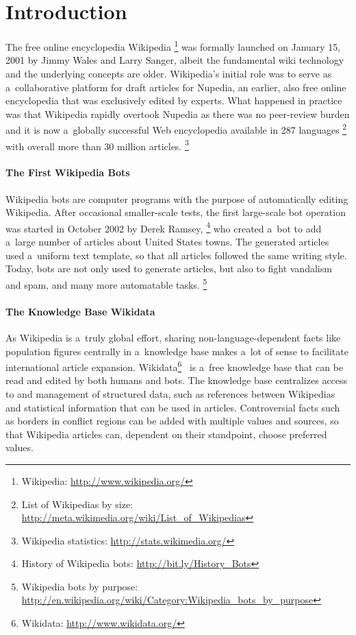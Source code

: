 \documentclass{sig-alternate-2013}
\newcommand{\inlinelistingsize}{\fontsize{8pt}{11pt}}
\let\oldurl\url
\renewcommand{\url}[1]{\inlinelistingsize\oldurl{#1}}
\begin{document}
\section{Introduction}

The free online encyclopedia Wikipedia%
\footnote{Wikipedia: \url{http://www.wikipedia.org/}}
was formally lau\-nched on January 15, 2001
by Jimmy Wales and Larry Sanger,
albeit the fundamental wiki technology and the underlying concepts are older.
Wikipedia's initial role was to serve
as a~collaborative platform for draft articles for Nupedia,
an earlier, also free online encyclopedia that was exclusively edited by experts.
What happened in practice was that Wikipedia rapidly overtook Nupedia
as there was no peer-review burden
and it is now a~globally successful Web encyclopedia
available in 287 languages%
\footnote{List of Wikipedias by size:
\url{http://meta.wikimedia.org/wiki/List_of_Wikipedias}}
with overall more than 30 million articles.%
\footnote{Wikipedia statistics: \url{http://stats.wikimedia.org/}}

\paragraph{The First Wikipedia Bots}

Wikipedia bots are computer programs
with the purpose of automatically editing Wikipedia.
After occasional smaller-scale tests,
the first large-scale bot operation
was started in October 2002 by Derek Ramsey,%
\footnote{History of Wikipedia bots:
\url{http://bit.ly/History_Bots}}
who created a~bot to add a~large number
of articles about United States towns.
The generated articles used a~uniform
text template, so that all articles
followed the same writing style.
Today, bots are not only used to generate articles,
but also to fight vandalism and spam,
and many more automatable tasks.%
\footnote{Wikipedia bots by purpose: \url{http://en.wikipedia.org/wiki/Category:Wikipedia_bots_by_purpose}}

\paragraph{The Knowledge Base Wikidata}

As Wikipedia is a~truly global effort,
sharing non-language-dependent facts
like population figures centrally
in a~know\-ledge base makes a~lot of sense
to facilitate international article expansion.
Wikidata\footnote{Wikidata: \url{http://www.wikidata.org/}}~\cite{vrandecic2012wikidata}
is a~free knowledge base that can be read
and edited by both humans and bots.
The knowledge base centralizes access to
and management of structured data,
such as references between Wikipedias
and statistical information that can be used in articles.
Controversial facts such as borders in conflict regions
can be added with multiple values and sources,
so that Wikipedia articles can,
dependent on their standpoint, choose preferred values.
\end{document}
